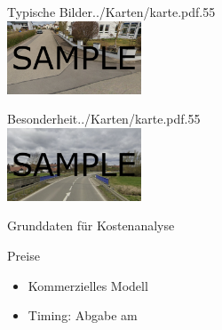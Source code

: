 \documentclass[11pt, dvipsnames,aspectratio=169]{beamer}
\begin{document}
\begin{mapframe}{Typische Bilder}{../Karten/karte.pdf}{.55\textwidth}
	\centering
	 \\[.3cm]
	\includegraphics[width=4cm]{../Bilder/wohnsiedlung.png} \\
	\scriptsize \bildzwei
\end{mapframe}

\begin{mapframe}{Besonderheit}{../Karten/karte.pdf}{.55\textwidth}
	\centering
	 \\[.3cm]
	\includegraphics[width=4cm]{../Bilder/besonderheit.png} \\
	\scriptsize \bilddrei
\end{mapframe}

\begin{frame}[t]{Grunddaten für Kostenanalyse}
	\scriptsize

	\hfill%
	\vspace{.2cm}

	\hfill%
\end{frame}

\begin{frame}{Preise \Ort}
	\begin{itemize}
		\setlength{\itemsep}{5pt}
		\item Kommerzielles Modell
		\begin{itemize}
			\preisliste
		\end{itemize}
		\item Timing: Abgabe am \Abgabedatum
	\end{itemize}
\end{frame}
\end{document}
